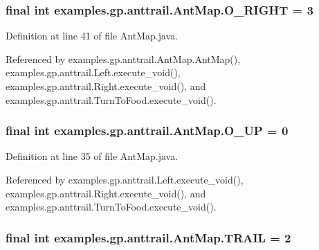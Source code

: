\hypertarget{classexamples_1_1gp_1_1anttrail_1_1_ant_map_acd27da7ca68a3c85f50b98bbc76d2630}{
\subsubsection[{O\-\_\-\-R\-I\-G\-H\-T}]{\setlength{\rightskip}{0pt plus 5cm}final int examples.\-gp.\-anttrail.\-Ant\-Map.\-O\-\_\-\-R\-I\-G\-H\-T = 3\hspace{0.3cm}{\ttfamily [static]}}}\label{classexamples_1_1gp_1_1anttrail_1_1_ant_map_acd27da7ca68a3c85f50b98bbc76d2630}


Definition at line 41 of file Ant\-Map.\-java.



Referenced by examples.\-gp.\-anttrail.\-Ant\-Map.\-Ant\-Map(), examples.\-gp.\-anttrail.\-Left.\-execute\-\_\-void(), examples.\-gp.\-anttrail.\-Right.\-execute\-\_\-void(), and examples.\-gp.\-anttrail.\-Turn\-To\-Food.\-execute\-\_\-void().

\hypertarget{classexamples_1_1gp_1_1anttrail_1_1_ant_map_a17d359be48b28de3b154da7804ffbdff}{
\subsubsection[{O\-\_\-\-U\-P}]{\setlength{\rightskip}{0pt plus 5cm}final int examples.\-gp.\-anttrail.\-Ant\-Map.\-O\-\_\-\-U\-P = 0\hspace{0.3cm}{\ttfamily [static]}}}\label{classexamples_1_1gp_1_1anttrail_1_1_ant_map_a17d359be48b28de3b154da7804ffbdff}


Definition at line 35 of file Ant\-Map.\-java.



Referenced by examples.\-gp.\-anttrail.\-Left.\-execute\-\_\-void(), examples.\-gp.\-anttrail.\-Right.\-execute\-\_\-void(), and examples.\-gp.\-anttrail.\-Turn\-To\-Food.\-execute\-\_\-void().

\hypertarget{classexamples_1_1gp_1_1anttrail_1_1_ant_map_ab715ea00036e795c9b177f10127a0dda}{
\subsubsection[{T\-R\-A\-I\-L}]{\setlength{\rightskip}{0pt plus 5cm}final int examples.\-gp.\-anttrail.\-Ant\-Map.\-T\-R\-A\-I\-L = 2\hspace{0.3cm}{\ttfamily [static]}}}\label{classexamples_1_1gp_1_1anttrail_1_1_ant_map_ab715ea00036e795c9b177f10127a0dda}


